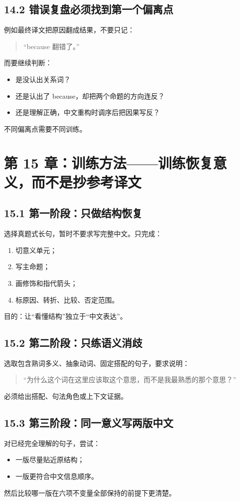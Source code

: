 \documentclass[11pt,a4paper]{ctexart}
\begin{document}
\subsection{14.2 错误复盘必须找到第一个偏离点}
例如最终译文把原因翻成结果，不要只记：
\begin{quote}
“because 翻错了。”
\end{quote}
而要继续判断：
\begin{itemize}
  \item 是没认出关系词？
  \item 还是认出了 because，却把两个命题的方向连反？
  \item 还是理解正确，中文重构时调序后把因果写反？
\end{itemize}
不同偏离点需要不同训练。

\section{第 15 章：训练方法——训练恢复意义，而不是抄参考译文}

\subsection{15.1 第一阶段：只做结构恢复}
选择真题式长句，暂时不要求写完整中文。只完成：
\begin{enumerate}
  \item 切意义单元；
  \item 写主命题；
  \item 画修饰和指代箭头；
  \item 标原因、转折、比较、否定范围。
\end{enumerate}

目的：让“看懂结构”独立于“中文表达”。

\subsection{15.2 第二阶段：只练语义消歧}
选取包含熟词多义、抽象动词、固定搭配的句子，要求说明：
\begin{quote}
“为什么这个词在这里应该取这个意思，而不是我最熟悉的那个意思？”
\end{quote}
必须给出搭配、句法角色或上下文证据。

\subsection{15.3 第三阶段：同一意义写两版中文}
对已经完全理解的句子，尝试：
\begin{itemize}
  \item 一版尽量贴近原结构；
  \item 一版更符合中文信息顺序。
\end{itemize}
然后比较哪一版在六项不变量全部保持的前提下更清楚。
\end{document}
